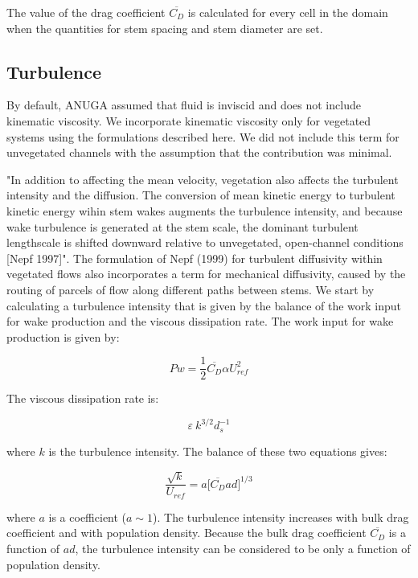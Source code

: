 \documentclass[10pt]{article}
\begin{document}
The value of the drag coefficient $\overline{C_D}$ is calculated for every cell in the domain when the quantities for stem spacing and stem diameter are set.

\subsection{Turbulence}

By default, ANUGA assumed that fluid is inviscid and does not include kinematic viscosity. We incorporate kinematic viscosity only for vegetated systems using the formulations described here. We did not include this term for unvegetated channels with the assumption that the contribution was minimal.

"In addition to affecting the mean velocity, vegetation also affects the turbulent intensity and the diffusion. The conversion of mean kinetic energy to turbulent kinetic energy wihin stem wakes augments the turbulence intensity, and because wake turbulence is generated at the stem scale, the dominant turbulent lengthscale is shifted downward relative to unvegetated, open-channel conditions [Nepf 1997]". The formulation of Nepf (1999) for turbulent diffusivity within vegetated flows also incorporates a term for mechanical diffusivity, caused by the routing of parcels of flow along different paths between stems. We start by calculating a turbulence intensity that is given by the balance of the work input for wake production and the viscous dissipation rate. The work input for wake production is given by:

\begin{equation}
Pw = \frac{1}{2}\overline{C_D} \alpha U_{ref}^2
\end{equation}

The viscous dissipation rate is:

\begin{equation}
\varepsilon ~ k^{3/2} d_s^{-1}
\end{equation}

\noindent where $k$ is the turbulence intensity. The balance of these two equations gives:

\begin{equation}
\frac{\sqrt{k}}{U_{ref}} = a\big[\overline{C_D} ad\big]^{1/3}
\end{equation}

\noindent where $a$ is a coefficient ($a\sim1$). The turbulence intensity increases with bulk drag coefficient and with population density. Because the bulk drag coefficient $\overline{C_D}$ is a function of $ad$, the turbulence intensity can be considered to be only a function of population density.
\end{document}
